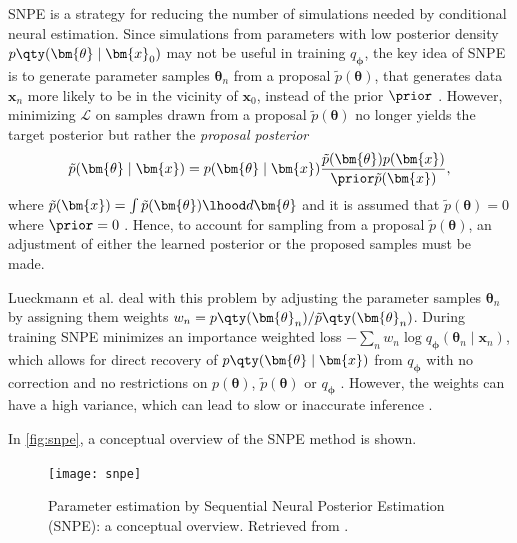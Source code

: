 SNPE is a strategy for reducing the number of simulations needed by conditional neural estimation. Since simulations from parameters with low posterior density $p \qty(\bm{\theta} \mid \bm{x}_0)$ may not be useful in training $q_{\bm{\phi}}$, the key idea of SNPE is to generate parameter samples $\bm{\theta}_n$ from a proposal $\tilde{p}(\bm{\theta})$, that generates data $\bm{x}_n$ more likely to be in the vicinity of $\bm{x}_0$,  instead of the prior $\prior$ \cite{SNL18}. However, minimizing $\mathcal{L}$ on samples drawn from a proposal $\tilde{p}(\bm{\theta})$ no longer yields the target posterior but rather the \textit{proposal posterior}
\begin{equation}
    \tilde{p}(\bm{\theta} \mid \bm{x}) = p (\bm{\theta} \mid \bm{x}) \frac{\tilde{p}(\bm{\theta}) p(\bm{x}) }{\prior \tilde{p}(\bm{x}) },
\end{equation}
where $\tilde{p}(\bm{x}) = \int \tilde{p} (\bm{\theta}) \lhood d\bm{\theta}$ and it is assumed that $\tilde{p} (\bm{\theta})=0$ where $\prior = 0$ \cite{apt}. Hence, to account for sampling from a proposal $\tilde{p}(\bm{\theta})$, an adjustment of either the learned posterior or the proposed samples must be made. 

Lueckmann et al. deal with this problem by adjusting the parameter samples $\bm{\theta}_n$ by assigning them weights $w_n = p \qty(\bm{\theta}_n)/ \tilde{p} \qty(\bm{\theta}_n)$. During training SNPE minimizes an importance weighted loss $- \sum_n w_n \log q_{\bm{\phi}}(\bm{\theta}_n \mid \bm{x}_n)$, which allows for direct recovery of $p \qty(\bm{\theta} \mid \bm{x})$ from $q_{\bm{\phi}}$ with no correction and no restrictions on $p(\bm{\theta})$, $\tilde{p}(\bm{\theta})$ or $q_{\bm{\phi}}$ \cite{apt}. However, the weights can have a high variance, which can lead to slow or inaccurate inference \cite{SNL18}.
  
In \autoref{fig:snpe}, a conceptual overview of the SNPE method is shown.

\begin{figure}[H]
\begin{center}\texttt{[image: snpe]}
\end{center}
\caption{Parameter estimation by Sequential Neural Posterior Estimation (SNPE): a conceptual overview. Retrieved from \cite[Figure 1]{SNPE19}.}
\label{fig:snpe}
\end{figure}





